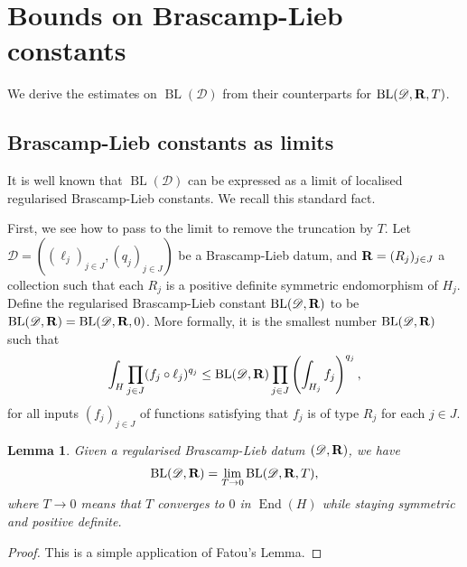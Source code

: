 \documentclass[a4paper,english]{amsart}
\newtheorem{lemma}[thm]{Lemma}
\theoremstyle{definition}
\newcommand{\1}{\mathbbm{1}}
\newcommand{\bbR}{{\bf{R}}}
\newcommand{\sD} {{\mathscr D}}
\DeclareMathOperator{\End}{End}
\DeclareMathOperator{\Id}{Id}
\DeclareMathOperator{\BL}{BL}
\begin{document}
\section{Bounds  on Brascamp-Lieb constants}  \label{Sec-compute-BL}

We derive the estimates on $\BL(\sD)$  from their counterparts for $\BL(\sD, \bbR, T)$.

\subsection{Brascamp-Lieb constants as limits}
It is well known that $\BL(\sD)$ can be expressed as a limit of localised regularised Brascamp-Lieb constants. We recall this standard fact.


 First, we see how to pass to the limit to remove the truncation by $T$. Let $\sD = ((\ell_j)_{j \in J}, (q_j)_{j \in J})$ be  a Brascamp-Lieb datum, and $\bbR = (R_{j})_{j \in J}$ a collection such that each $R_j$ is a positive definite symmetric endomorphism of $H_j$.
Define the regularised Brascamp-Lieb constant $\BL(\sD, \bbR)$ to be $\BL(\sD, \bbR)=\BL(\sD, \bbR, 0)$. More formally, it is the smallest number $\BL(\sD, \bbR)$ such that
\[
\int_{H} \prod_{j \in J} (f_{j}\circ \ell_{j})^{q_{j}} \leq \BL(\sD, \bbR) \prod_{j \in J} \left(\int_{H_{j}} f_{j} \right)^{q_{j}},
\]
for all inputs $(f_{j})_{j \in J}$ of functions satisfying that $f_j$ is of type $R_j$ for each $j \in J$.

\begin{lemma}\label{lm:BLlimT}
Given a regularised Brascamp-Lieb datum $(\sD, \bbR)$, we have
\[
\BL(\sD, \bbR) = \lim_{T \to 0} \BL(\sD, \bbR, T),
\]
where $T \to 0$ means that $T$ converges to $0$ in $\End(H)$ while staying symmetric and positive definite.
\end{lemma}
\begin{proof}
This is a simple application of Fatou's Lemma. %
\end{proof}
\end{document}
